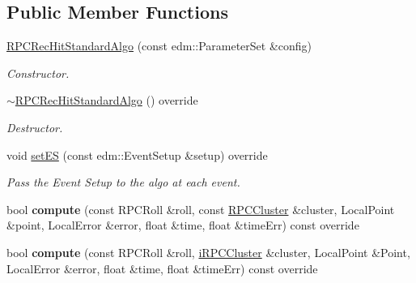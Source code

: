 \subsection*{Public Member Functions}
\begin{DoxyCompactItemize}
\item 
\hypertarget{classRPCRecHitStandardAlgo_a9c217d736f5afc104990d32a9ab12d26}{\hyperlink{classRPCRecHitStandardAlgo_a9c217d736f5afc104990d32a9ab12d26}{R\-P\-C\-Rec\-Hit\-Standard\-Algo} (const edm\-::\-Parameter\-Set \&config)}\label{classRPCRecHitStandardAlgo_a9c217d736f5afc104990d32a9ab12d26}

\begin{DoxyCompactList}\small\item\em Constructor. \end{DoxyCompactList}\item 
\hypertarget{classRPCRecHitStandardAlgo_aca26b5e3675d5db683fe34258e4b39a8}{\hyperlink{classRPCRecHitStandardAlgo_aca26b5e3675d5db683fe34258e4b39a8}{$\sim$\-R\-P\-C\-Rec\-Hit\-Standard\-Algo} () override}\label{classRPCRecHitStandardAlgo_aca26b5e3675d5db683fe34258e4b39a8}

\begin{DoxyCompactList}\small\item\em Destructor. \end{DoxyCompactList}\item 
\hypertarget{classRPCRecHitStandardAlgo_ae0d0524dd4f39ba36c35ac3f9247f0f5}{void \hyperlink{classRPCRecHitStandardAlgo_ae0d0524dd4f39ba36c35ac3f9247f0f5}{set\-E\-S} (const edm\-::\-Event\-Setup \&setup) override}\label{classRPCRecHitStandardAlgo_ae0d0524dd4f39ba36c35ac3f9247f0f5}

\begin{DoxyCompactList}\small\item\em Pass the Event Setup to the algo at each event. \end{DoxyCompactList}\item 
\hypertarget{classRPCRecHitStandardAlgo_aa1d9a7d6100cc6b4702a1797da2c1b21}{bool {\bfseries compute} (const R\-P\-C\-Roll \&roll, const \hyperlink{classRPCCluster}{R\-P\-C\-Cluster} \&cluster, Local\-Point \&point, Local\-Error \&error, float \&time, float \&time\-Err) const override}\label{classRPCRecHitStandardAlgo_aa1d9a7d6100cc6b4702a1797da2c1b21}

\item 
\hypertarget{classRPCRecHitStandardAlgo_a67e517eee5575ff548e77ac5c944d597}{bool {\bfseries compute} (const R\-P\-C\-Roll \&roll, \hyperlink{classiRPCCluster}{i\-R\-P\-C\-Cluster} \&cluster, Local\-Point \&Point, Local\-Error \&error, float \&time, float \&time\-Err) const override}\label{classRPCRecHitStandardAlgo_a67e517eee5575ff548e77ac5c944d597}


\end{DoxyCompactItemize}
